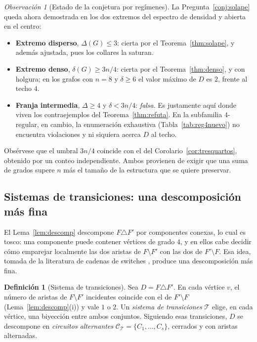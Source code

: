 \documentclass[11pt,a4paper]{article}
\theoremstyle{definition}
\newtheorem{definicion}[teorema]{Definición}
\theoremstyle{remark}
\newtheorem{observacion}[teorema]{Observación}
\begin{document}
\begin{observacion}[Estado de la conjetura por regímenes]\label{obs:regimenes}
La Pregunta~\ref{conj:solape} queda ahora demostrada en los dos extremos del espectro de densidad y abierta en el centro:
\begin{itemize}
\item \textbf{Extremo disperso}, $\Delta(G)\le3$: cierta por el Teorema~\ref{thm:solape}, y además ajustada, pues los collares la saturan.
\item \textbf{Extremo denso}, $\delta(G)\ge 3n/4$: cierta por el Teorema~\ref{thm:denso}, y con holgura; en los grafos con $n=8$ y $\delta\ge6$ el valor máximo de $D$ es $2$, frente al techo $4$.
\item \textbf{Franja intermedia}, $\Delta\ge4$ y $\delta<3n/4$: \emph{falsa}. Es justamente aquí donde viven los contraejemplos del Teorema~\ref{thm:refuta}. En la subfamilia $4$-regular, en cambio, la enumeración exhaustiva (Tabla~\ref{tab:reg4nuevo}) no encuentra violaciones y ni siquiera acerca $D$ al techo.
\end{itemize}
Obsérvese que el umbral $3n/4$ coincide con el del Corolario~\ref{cor:tresquartos}, obtenido por un conteo independiente. Ambos provienen de exigir que una suma de grados supere $n$ más el tamaño de la estructura que se quiere preservar.
\end{observacion}


\subsection{Sistemas de transiciones: una descomposición más fina}\label{sub:transiciones}

El Lema~\ref{lem:descomp} descompone $F\triangle F'$ por componentes conexas, lo cual es tosco: una componente puede contener vértices de grado $4$, y en ellos cabe decidir cómo emparejar localmente las dos aristas de $F\setminus F'$ con las dos de $F'\setminus F$. Esa idea, tomada de la literatura de cadenas de switches \cite{egm21}, produce una descomposición más fina.

\begin{definicion}[Sistema de transiciones]
Sea $D=F\triangle F'$. En cada vértice $v$, el número de aristas de $F\setminus F'$ incidentes coincide con el de $F'\setminus F$ (Lema~\ref{lem:descomp}(i)) y vale $1$ o $2$. Un \emph{sistema de transiciones} $\mathcal{T}$ elige, en cada vértice, una biyección entre ambos conjuntos. Siguiendo esas transiciones, $D$ se descompone en \emph{circuitos alternantes} $\mathcal{C}_{\mathcal T}=\{C_1,\dots,C_s\}$, cerrados y con aristas alternadas.
\end{definicion}
\end{document}
